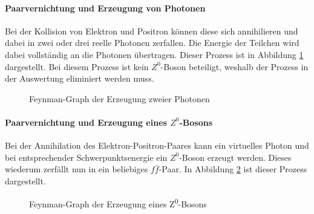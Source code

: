 \paragraph{Paarvernichtung und Erzeugung von Photonen}
Bei der Kollision von Elektron und Positron können diese sich annihilieren und dabei in zwei oder drei reelle Photonen zerfallen. Die Energie der Teilchen wird dabei vollständig an die Photonen übertragen. Dieser Prozess ist in Abbildung \ref{fig:feynmanphotonen} dargestellt. Bei diesem Prozess ist kein $Z^0$-Boson beteiligt, weshalb der Prozess in der Auswertung eliminiert werden muss.

\begin{figure}[b]
	\centering
	\caption{Feynman-Graph der Erzeugung zweier Photonen}
	\label{fig:feynmanphotonen}
\end{figure}

\paragraph{Paarvernichtung und Erzeugung eines $Z^0$-Bosons}
Bei der Annihilation des Elektron-Positron-Paares kann ein virtuelles Photon und bei entsprechender Schwerpunktsenergie ein $Z^0$-Boson erzeugt werden. Dieses wiederum zerfällt nun in ein beliebiges $f\bar f$-Paar. In Abbildung \ref{fig:feynmanz0} ist dieser Prozess dargestellt.

\begin{figure}
	\centering
	\caption{Feynman-Graph der Erzeugung eines Z\textsuperscript0-Bosons}
	\label{fig:feynmanz0}
\end{figure}

